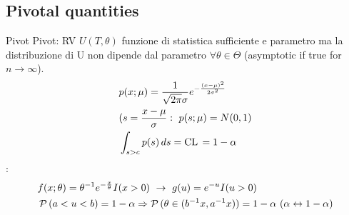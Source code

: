 \documentclass[asd-beamer.tex]{subfiles}
\begin{document}
\subsection{Pivotal quantities}

\begin{frame}{Pivot}
Pivot: RV $U(T,\theta)$ funzione di statistica sufficiente e parametro ma la distribuzione di U non dipende dal parametro $\forall \theta\in\Theta$ (asymptotic if true for $n\to\infty$).
\begin{align*}
&p(x;\mu)=\frac{1}{\sqrt{2\pi}\sigma}e^{-\frac{(x-\mu)^2}{2\sigma^2}}\\
&(s=\frac{x-\mu}{\sigma}:\ p(s;\mu)=N(0,1)\\
&\int_{s>c}p(s)\,ds=\operatorname{CL}{}=1-\alpha
\end{align*}
:
\begin{align*}
&f(x;\theta)=\invers{\theta}\exp{-\frac{x}{\theta}}I(x>0)\ \to\ g(u)=\exp{-u}I(u>0)\\
&\prob{(a<u<b)}=1-\alpha\Rightarrow\prob{(\theta\in(\invers{b}x,\invers{a}x))}=1-\alpha\ (\alpha\leftrightarrow1-\alpha)
\end{align*}
\end{frame}
\end{document}
